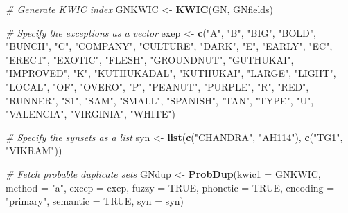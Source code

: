 \documentclass[
]{article}
\newenvironment{Shaded}{\begin{snugshade}}{\end{snugshade}}
\newcommand{\CommentTok}[1]{\textcolor[rgb]{0.56,0.35,0.01}{\textit{#1}}}
\newcommand{\DataTypeTok}[1]{\textcolor[rgb]{0.13,0.29,0.53}{#1}}
\newcommand{\KeywordTok}[1]{\textcolor[rgb]{0.13,0.29,0.53}{\textbf{#1}}}
\newcommand{\NormalTok}[1]{#1}
\newcommand{\OtherTok}[1]{\textcolor[rgb]{0.56,0.35,0.01}{#1}}
\newcommand{\StringTok}[1]{\textcolor[rgb]{0.31,0.60,0.02}{#1}}
\begin{document}
\begin{Shaded}
\begin{Highlighting}[]
\CommentTok{# Generate KWIC index}
\NormalTok{GNKWIC <-}\StringTok{ }\KeywordTok{KWIC}\NormalTok{(GN, GNfields)}

\CommentTok{# Specify the exceptions as a vector}
\NormalTok{exep <-}\StringTok{ }\KeywordTok{c}\NormalTok{(}\StringTok{"A"}\NormalTok{, }\StringTok{"B"}\NormalTok{, }\StringTok{"BIG"}\NormalTok{, }\StringTok{"BOLD"}\NormalTok{, }\StringTok{"BUNCH"}\NormalTok{, }\StringTok{"C"}\NormalTok{, }\StringTok{"COMPANY"}\NormalTok{, }\StringTok{"CULTURE"}\NormalTok{,}
         \StringTok{"DARK"}\NormalTok{, }\StringTok{"E"}\NormalTok{, }\StringTok{"EARLY"}\NormalTok{, }\StringTok{"EC"}\NormalTok{, }\StringTok{"ERECT"}\NormalTok{, }\StringTok{"EXOTIC"}\NormalTok{, }\StringTok{"FLESH"}\NormalTok{, }\StringTok{"GROUNDNUT"}\NormalTok{,}
         \StringTok{"GUTHUKAI"}\NormalTok{, }\StringTok{"IMPROVED"}\NormalTok{, }\StringTok{"K"}\NormalTok{, }\StringTok{"KUTHUKADAL"}\NormalTok{, }\StringTok{"KUTHUKAI"}\NormalTok{, }\StringTok{"LARGE"}\NormalTok{,}
         \StringTok{"LIGHT"}\NormalTok{, }\StringTok{"LOCAL"}\NormalTok{, }\StringTok{"OF"}\NormalTok{, }\StringTok{"OVERO"}\NormalTok{, }\StringTok{"P"}\NormalTok{, }\StringTok{"PEANUT"}\NormalTok{, }\StringTok{"PURPLE"}\NormalTok{, }\StringTok{"R"}\NormalTok{,}
         \StringTok{"RED"}\NormalTok{, }\StringTok{"RUNNER"}\NormalTok{, }\StringTok{"S1"}\NormalTok{, }\StringTok{"SAM"}\NormalTok{, }\StringTok{"SMALL"}\NormalTok{, }\StringTok{"SPANISH"}\NormalTok{, }\StringTok{"TAN"}\NormalTok{, }\StringTok{"TYPE"}\NormalTok{,}
         \StringTok{"U"}\NormalTok{, }\StringTok{"VALENCIA"}\NormalTok{, }\StringTok{"VIRGINIA"}\NormalTok{, }\StringTok{"WHITE"}\NormalTok{)}

\CommentTok{# Specify the synsets as a list}
\NormalTok{syn <-}\StringTok{ }\KeywordTok{list}\NormalTok{(}\KeywordTok{c}\NormalTok{(}\StringTok{"CHANDRA"}\NormalTok{, }\StringTok{"AH114"}\NormalTok{), }\KeywordTok{c}\NormalTok{(}\StringTok{"TG1"}\NormalTok{, }\StringTok{"VIKRAM"}\NormalTok{))}

\CommentTok{# Fetch probable duplicate sets}
\NormalTok{GNdup <-}\StringTok{ }\KeywordTok{ProbDup}\NormalTok{(}\DataTypeTok{kwic1 =}\NormalTok{ GNKWIC, }\DataTypeTok{method =} \StringTok{"a"}\NormalTok{, }\DataTypeTok{excep =}\NormalTok{ exep, }\DataTypeTok{fuzzy =} \OtherTok{TRUE}\NormalTok{,}
                 \DataTypeTok{phonetic =} \OtherTok{TRUE}\NormalTok{, }\DataTypeTok{encoding =} \StringTok{"primary"}\NormalTok{,}
                 \DataTypeTok{semantic =} \OtherTok{TRUE}\NormalTok{, }\DataTypeTok{syn =}\NormalTok{ syn)}
\end{Highlighting}
\end{Shaded}
\end{document}
